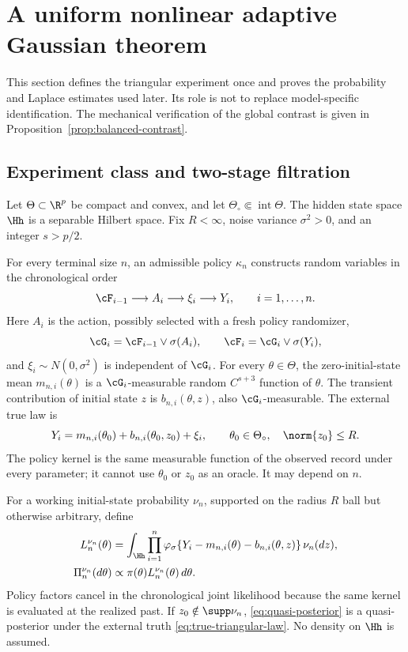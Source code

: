 
\section{A uniform nonlinear adaptive Gaussian theorem}
\label{sec:triangular}

This section defines the triangular experiment once and proves the probability
and Laplace estimates used later.  Its role is not to replace model-specific
identification.  The mechanical verification of the global contrast is given
in Proposition~\ref{prop:balanced-contrast}.

\subsection{Experiment class and two-stage filtration}

Let \(\Theta\subset\R^p\) be compact and convex, and let
\(\Theta_\circ\Subset\operatorname{int}\Theta\).  The hidden state space
\(\Hh\) is a separable Hilbert space.  Fix \(R<\infty\), noise variance
\(\sigma^2>0\), and an integer \(s>p/2\).

\begin{definition}
\label{def:triangular}
For every terminal size \(n\), an admissible policy \(\kappa_n\) constructs
random variables in the chronological order
\[
 \cF_{i-1}\longrightarrow A_i\longrightarrow\xi_i\longrightarrow Y_i,
 \qquad i=1,\ldots,n.
\]
Here \(A_i\) is the action, possibly selected with a fresh policy randomizer,
\[
 \cG_i=\cF_{i-1}\vee\sigma(A_i),
 \qquad
 \cF_i=\cG_i\vee\sigma(Y_i),
\]
and \(\xi_i\sim N(0,\sigma^2)\) is independent of \(\cG_i\).  For every
\(\theta\in\Theta\), the zero-initial-state mean \(m_{n,i}(\theta)\) is a
\(\cG_i\)-measurable random \(C^{s+3}\) function of \(\theta\).  The
transient contribution of initial state \(z\) is
\(b_{n,i}(\theta,z)\), also \(\cG_i\)-measurable.  The external true law is
\begin{equation}
 Y_i=m_{n,i}(\theta_0)+b_{n,i}(\theta_0,z_0)+\xi_i,
 \qquad \theta_0\in\Theta_\circ,\quad\norm{z_0}\le R.
 \label{eq:true-triangular-law}
\end{equation}
The policy kernel is the same measurable function of the observed record
under every parameter; it cannot use \(\theta_0\) or \(z_0\) as an oracle.
It may depend on \(n\).
\end{definition}

For a working initial-state probability \(\nu_n\), supported on the radius
\(R\) ball but otherwise arbitrary, define
\begin{align}
 L_{n}^{\nu_n}(\theta)
 &=\int_{\Hh}\prod_{i=1}^n
 \varphi_\sigma\{Y_i-m_{n,i}(\theta)-b_{n,i}(\theta,z)\}\,\nu_n(dz),
 \label{eq:marginal-likelihood}\\
 \Pi_{n}^{\nu_n}(d\theta)
 &\propto \pi(\theta)L_n^{\nu_n}(\theta)\,d\theta .
 \label{eq:quasi-posterior}
\end{align}
Policy factors cancel in the chronological joint likelihood because the same
kernel is evaluated at the realized past.  If \(z_0\notin\supp\nu_n\),
\eqref{eq:quasi-posterior} is a quasi-posterior under the external truth
\eqref{eq:true-triangular-law}.  No density on \(\Hh\) is assumed.

